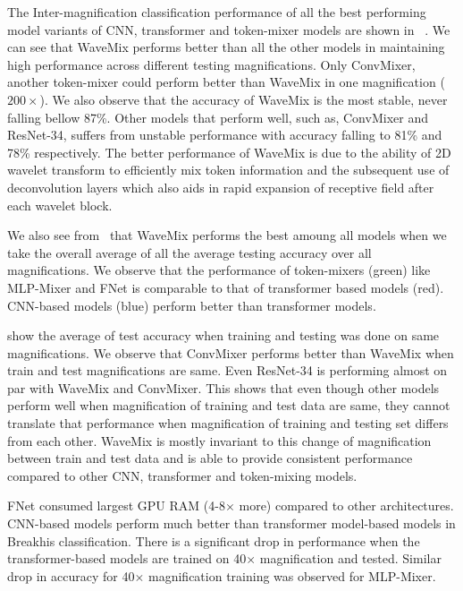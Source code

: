 \documentclass[nohyperref]{article}
\theoremstyle{plain}
\theoremstyle{definition}
\theoremstyle{remark}
\begin{document}
The Inter-magnification classification performance of all the best performing model variants of CNN, transformer and token-mixer models are shown in ~. We can see that WaveMix performs better than all the other models in maintaining high performance across different testing magnifications. Only ConvMixer, another token-mixer could perform better than WaveMix in one magnification ($200\times$). We also observe that the accuracy of WaveMix  is the most stable, never falling bellow 87\%. Other models that perform well, such as, ConvMixer  and ResNet-34, suffers from unstable performance with accuracy falling to 81\% and 78\% respectively. The better performance of WaveMix is due to the ability of 2D wavelet transform to efficiently mix token information and the subsequent use of deconvolution layers which also aids in rapid expansion of receptive field after each wavelet block.

We also see from~ that WaveMix performs the best amoung all models when we take the overall average of all the average testing accuracy over all magnifications. We observe that the performance of token-mixers (green) like MLP-Mixer and FNet is comparable to that of transformer based models (red). CNN-based models (blue) perform better than transformer models. 

 show the average of test accuracy when training and testing was done on same magnifications. We observe that ConvMixer performs better than WaveMix when train and test magnifications are same. Even ResNet-34 is performing almost on par with WaveMix and ConvMixer. This shows that even though other models perform well when magnification of training and test data are same, they cannot translate that performance when magnification of training and testing set differs from each other. WaveMix is mostly invariant to this change of magnification between train and test data and is able to provide consistent performance compared to other CNN, transformer and token-mixing models.


FNet consumed largest GPU RAM (4-8$\times$ more) compared to other architectures. CNN-based models perform much better than transformer model-based models in Breakhis classification. There is a significant drop in performance when the transformer-based models are trained on 40$\times$ magnification and tested. Similar drop in accuracy for 40$\times$ magnification training was observed for MLP-Mixer.
\end{document}
